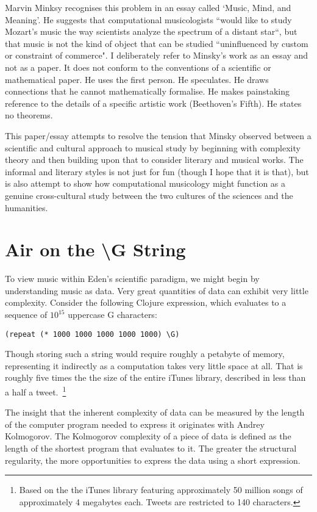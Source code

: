\documentclass[numbers]{sigplanconf}
\begin{document}
Marvin Minksy recognises this problem in an essay called `Music, Mind, and Meaning'. He suggests that computational
musicologists ``would like to study Mozart's music the way scientists analyze the spectrum of a distant star``, but that music
is not the kind of object that can be studied ``uninfluenced by custom or constraint of commerce"\cite{Music, Mind and Meaning}.
I deliberately refer to Minsky's work as an essay and not as a paper. It does not conform to the conventions of a scientific
or mathematical paper. He uses the first person. He speculates. He draws connections that he cannot mathematically formalise.
He makes painstaking reference to the details of a specific artistic work (Beethoven's Fifth). He states no theorems.

This paper/essay attempts to resolve the tension that Minsky observed between a scientific and cultural approach to musical study
by beginning with complexity theory and then building upon that to consider literary and musical works. The informal and literary
styles is not just for fun (though I hope that it is that), but is also attempt to show how computational musicology might
function as a genuine cross-cultural study between the two cultures of the sciences and the humanities.

\section{Air on the {\textbackslash}G String}
To view music within Eden's scientific paradigm, we might begin by understanding music as data.
Very great quantities of data can exhibit very little complexity. Consider the following Clojure expression, which
evaluates to a sequence of $10^{15}$ uppercase G characters:

\begin{verbatim}
(repeat (* 1000 1000 1000 1000 1000) \G)
\end{verbatim}

Though storing such a string would require roughly a petabyte of memory, representing it indirectly as a computation
takes very little space at all. That is roughly five times the the size of the entire iTunes library,
described in less than a half a tweet.~\footnote{Based on the the iTunes library featuring approximately 50 million songs
of approximately 4 megabytes each. Tweets are restricted to 140 characters.}

The insight that the inherent complexity of data can be measured by the length of the computer program needed to express it
originates with Andrey Kolmogorov\cite{On Tables of Random Numbers}. The Kolmogorov complexity of a piece of data is defined
as the length of the shortest program that evaluates to it. The greater the structural regularity, the more opportunities
to express the data using a short expression.
\end{document}
